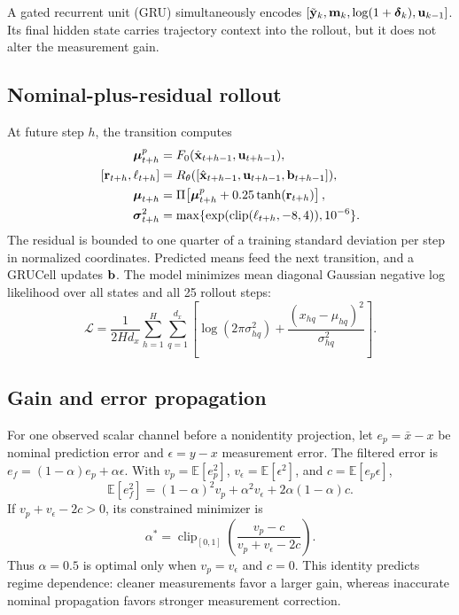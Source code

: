 A gated recurrent unit (GRU) simultaneously encodes
$[\tilde{\mathbf{y}}_k,\mathbf{m}_k,\log(1+\boldsymbol\delta_k),\mathbf{u}_{k-1}]$.
Its final hidden state carries trajectory context into the rollout, but it does
not alter the measurement gain.

\subsection{Nominal-plus-residual rollout}

At future step $h$, the transition computes
\begin{align}
 \boldsymbol\mu^{p}_{t+h} &= F_0(\hat{\vect x}_{t+h-1},\vect u_{t+h-1}), \\
 [\vect r_{t+h},\vect \ell_{t+h}] &=
 R_\theta([\hat{\vect x}_{t+h-1},\vect u_{t+h-1},\vect b_{t+h-1}]), \\
 \boldsymbol\mu_{t+h} &= \Pi\!\left[
 \boldsymbol\mu^{p}_{t+h}+0.25\tanh(\vect r_{t+h})\right], \\
 \boldsymbol\sigma^2_{t+h} &=
 \max\{\exp(\operatorname{clip}(\vect\ell_{t+h},-8,4)),10^{-6}\}.
 \label{eq:rollout}
\end{align}
The residual is bounded to one quarter of a training standard deviation per
step in normalized coordinates. Predicted means feed the next transition, and
a GRUCell updates $\mathbf{b}$. The model minimizes mean diagonal Gaussian
negative log likelihood over all states and all 25 rollout steps:
\begin{equation}
 \mathcal L=\frac{1}{2Hd_x}\sum_{h=1}^{H}\sum_{q=1}^{d_x}
 \left[\log(2\pi\sigma_{hq}^2)+
 \frac{(x_{hq}-\mu_{hq})^2}{\sigma_{hq}^2}\right].
 \label{eq:nll}
\end{equation}

\subsection{Gain and error propagation}

For one observed scalar channel before a nonidentity projection, let
$e_p=\bar x-x$ be nominal prediction error and $\epsilon=y-x$ measurement
error. The filtered error is
$e_f=(1-\alpha)e_p+\alpha\epsilon$. With
$v_p=\mathbb E[e_p^2]$, $v_\epsilon=\mathbb E[\epsilon^2]$, and
$c=\mathbb E[e_p\epsilon]$,
\begin{equation}
 \mathbb E[e_f^2]=(1-\alpha)^2v_p+\alpha^2v_\epsilon
 +2\alpha(1-\alpha)c.
 \label{eq:mse}
\end{equation}
If $v_p+v_\epsilon-2c>0$, its constrained minimizer is
\begin{equation}
 \alpha^*=\operatorname{clip}_{[0,1]}
 \left(\frac{v_p-c}{v_p+v_\epsilon-2c}\right).
 \label{eq:alpha}
\end{equation}
Thus $\alpha=0.5$ is optimal only when $v_p=v_\epsilon$ and $c=0$. This
identity predicts regime dependence: cleaner measurements favor a larger gain,
whereas inaccurate nominal propagation favors stronger measurement correction.

